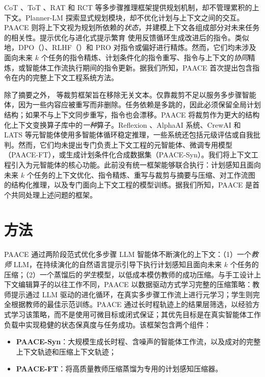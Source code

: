 \documentclass[10pt,twocolumn]{article}
\begin{document}
CoT \citep{wei2022cot}、ToT \citep{yao2023tree}、RAT \citep{zhang2023rat} 和 RCT \citep{zhou2023rct} 等多步骤推理框架提供规划机制，却不管理累积的上下文。Planner-LM \citep{huang2024plan} 探索显式规划模块，却不优化计划与上下文之间的交互。PAACE 则将上下文视为规划所依赖的\emph{状态}，并建模上下文各组成部分对未来任务的相关性。提示优化与进化式提示繁育 \citep{zhou2023largepromptopt,pryzant2023automated} 使用反馈循环生成改进后的指令。类似地，DPO（\citealp{rafailov2023dpo}）、RLHF（\citealp{ouyang2022rlhf}）和 PRO \citep{saunders2024pro} 对指令或偏好进行精炼。然而，它们均未涉及面向未来 $k$ 个任务的指令精炼、计划条件化的指令重写、指令与上下文的\emph{协同}精炼，或智能体工作流执行期间的指令更新。据我们所知，PAACE 首次提出包含指令在内的完整上下文工程系统方法。

除了摘要之外，\citet{wu2024provence} 等裁剪框架旨在移除无关文本。仅靠裁剪不足以服务多步骤智能体，因为一些内容应被重写而非删除。任务依赖是多跳的，因此必须保留全局计划结构；如果不与上下文同步重写，指令也会漂移。PAACE 将裁剪作为更大的结构化上下文变换算子库中的\emph{一种}算子。Reflexion \citep{shinn2023reflexion}、AlphaAI 系统、CrewAI 和 LATS \citep{zhou2022lats} 等元智能体使用多智能体循环稳定推理，一些系统还包括元级评估或自我批判。然而，它们均未提出专门负责上下文工程的元智能体、微调专用模型（PAACE-FT），或生成计划条件化合成数据集（PAACE-Syn）。我们将上下文工程引入为元智能体的核心功能。此前没有统一框架能够联合执行：计划感知且面向未来 $k$ 个任务的上下文优化、指令精炼、重写与裁剪与摘要与压缩、对工作流图的结构化推理，以及专门面向上下文工程的模型训练。据我们所知，PAACE 是首个共同处理上述问题的框架。

\section{方法}
\label{sec:method}

PAACE 通过两阶段范式优化多步骤 LLM 智能体不断演化的上下文：（1）一个\emph{教师} LLM，在持续演化的自然语言提示引导下执行计划感知且面向未来 $k$ 个任务的压缩；（2）一个蒸馏后的\emph{学生}模型，以低成本模仿教师的成功压缩。与手工设计上下文编辑算子的以往工作不同，PAACE 以数据驱动方式学习完整的压缩策略：教师提示通过 LLM 驱动的进化循环，在真实多步骤工作流上进行元学习；学生则完全根据教师的最佳示范训练。PAACE 通过长时程轨迹上的结果层筛选，以经验方式学习该策略，而不是使用可微目标或闭式保证；其优先目标是在真实智能体工作负载中实现稳健的状态保真度与任务成功。该框架包含两个组件：
\begin{itemize}
  \item \textbf{PAACE-Syn}：大规模生成长时程、含噪声的智能体工作流，以及成对的完整上下文轨迹和压缩上下文轨迹；
  \item \textbf{PAACE-FT}：将高质量教师压缩蒸馏为专用的计划感知压缩器。
\end{itemize}
\end{document}

